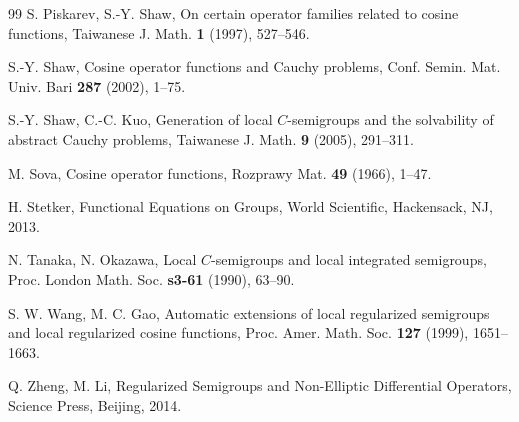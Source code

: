 \documentclass{amsart}
\theoremstyle{definition}
\theoremstyle{remark}
\numberwithin{equation}{section}
\begin{document}
\begin{thebibliography}{99}
S. Piskarev, S.-Y. Shaw, 
On certain operator families related to cosine functions,
Taiwanese J. Math. {\bf 1} (1997), 527--546.

S.-Y. Shaw,
Cosine operator functions and Cauchy problems,
Conf. Semin. Mat. Univ. Bari \textbf{287} (2002), 1--75.

S.-Y. Shaw, C.-C. Kuo,
Generation of local $C$-semigroups and the solvability of abstract Cauchy problems,
Taiwanese J. Math. {\bf 9} (2005), 291--311.

M. Sova,
Cosine operator functions,
Rozprawy Mat. \textbf{49} (1966), 1--47.

H. Stetker, 
Functional Equations on Groups, 
World Scientific, Hackensack, NJ, 2013.

N. Tanaka, N. Okazawa, 
Local $C$-semigroups and local integrated semigroups,
Proc. London Math. Soc. {\bf s3-61} (1990), 63--90.

S. W. Wang, M. C. Gao,  
Automatic extensions of local regularized semigroups and local
regularized cosine functions,
Proc. Amer. Math. Soc. {\bf 127} (1999), 1651--1663.

Q. Zheng, M. Li, 
Regularized Semigroups and Non-Elliptic Differential Operators, 
Science Press, Beijing, 2014.

\end{thebibliography}
\end{document}
